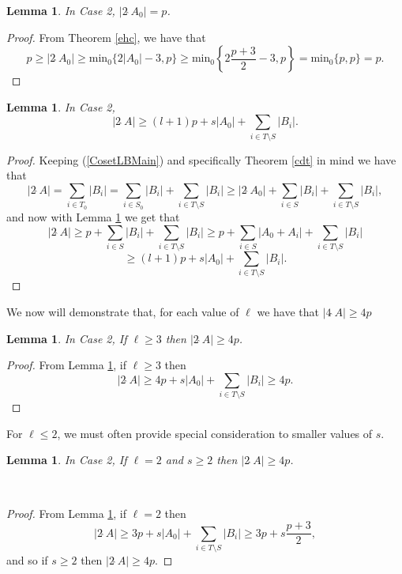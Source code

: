 \documentclass[a4paper, 12pt]{article}\usepackage[english]{babel}
\newtheorem{lem}[thm]{Lemma}
\newcommand{\minz}{\mathrm{min}_0}
\newcommand{\<}{\langle}
\begin{document}
\begin{lem}\label{Case2:2A0}
    In Case 2, $|2\hat{\;}A_0|=p$.
\end{lem}
\begin{proof}
    From Theorem \ref{ehc}, we have that \[p\geq |2\hat{\;}A_0|\geq \minz\{2|A_0|-3,p\}\geq \minz\left\{2\frac{p+3}{2}-3,p\right\}=\minz\{p,p\}=p.\]
\end{proof}

\begin{lem}\label{Case2Backbone}
    In Case 2, \[|2\hat{\;}A|\geq (l+1)p+s|A_0|+\sum_{i\in T\setminus S}|B_i|.\]
\end{lem}
\begin{proof}
    Keeping (\ref{CosetLBMain}) and specifically Theorem \ref{cdt} in mind we have that
     \[|2\hat{\;}A|= \sum_{i\in T_0}|B_i|=\sum_{i\in S_0}|B_i|+\sum_{i\in T\setminus S}|B_i|\geq |2\hat{\;}A_0|+\sum_{i\in S}|B_i|+\sum_{i\in T\setminus S}|B_i|,\] and now with Lemma \ref{Case2:2A0} we get that \[|2\hat{\;}A|\geq p+\sum_{i\in S}|B_i|+\sum_{i\in T\setminus S}|B_i|\geq p+\sum_{i\in S}|A_0+A_i|+\sum_{i\in T\setminus S}|B_i|\]
     \[\geq (l+1)p+s|A_0|+\sum_{i\in T\setminus S}|B_i|.\]
\end{proof}

We now will demonstrate that, for each value of $\ell$ we have that $|4\hat{\;}A|\geq 4p$

\begin{lem}\label{Case2:lg3}
In Case 2, If $\ell\geq 3$ then $|2\hat{\;}A|\geq 4p$.
\end{lem}
\begin{proof}
    From Lemma \ref{Case2Backbone}, if $\ell\geq 3$ then \[|2\hat{\;}A|\geq 4p+s|A_0|+\sum_{i\in T\setminus S}|B_i|\geq 4p. \]
\end{proof}
For $\ell \leq 2$, we must often provide special consideration to smaller values of $s$.
\begin{lem}\label{Case2:L2S2}
    In Case 2, If $\ell=2$ and $s\geq 2$ then $|2\hat{\;}A|\geq 4p$.
\end{lem}\
\begin{proof}
    From Lemma \ref{Case2Backbone}, if $\ell=2$ then \[|2\hat{\;}A|\geq 3p+s|A_0|+\sum_{i\in T\setminus S}|B_i|\geq 3p+s\frac{p+3}{2},\] and so if $s\geq 2$ then $|2\hat{\;}A|\geq 4p$.
\end{proof}
\end{document}
